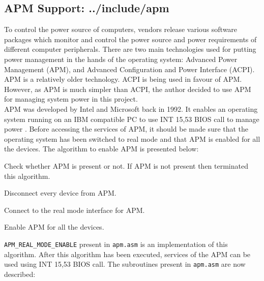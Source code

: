 \subsection{APM Support: ../include/apm}
To control the power source of computers, vendors release various software packages which monitor and control the power source and power requirements of different computer peripherals. There are two main technologies used for putting power management in the hands of the operating system: Advanced Power Management (APM), and Advanced Configuration and Power Interface (ACPI). APM is a relatively older technology. ACPI is being used in favour of APM. However, as APM is much simpler than ACPI, the author decided to use APM for managing system power in this project.\\
APM was developed by Intel and Microsoft back in 1992. It enables an operating system running on an IBM compatible PC to use INT 15,53 BIOS call to manage power \cite{apm199612}. Before accessing the services of APM, it should be made sure that the operating system has been switched to real mode and that APM is enabled for all the devices. The algorithm to enable APM is presented below:
\begin{steps}[leftmargin=2cm]
  \item Check whether APM is present or not. If APM is not present then terminated this algorithm.
  \item Disconnect every device from APM.
  \item Connect to the real mode interface for APM.
  \item Enable APM for all the devices.
\end{steps}
\texttt{APM\_REAL\_MODE\_ENABLE} present in \texttt{apm.asm} is an implementation of this algorithm. After this algorithm has been executed, services of the APM can be used using INT 15,53 BIOS call.
The subroutines present in \texttt{apm.asm} are now described:
